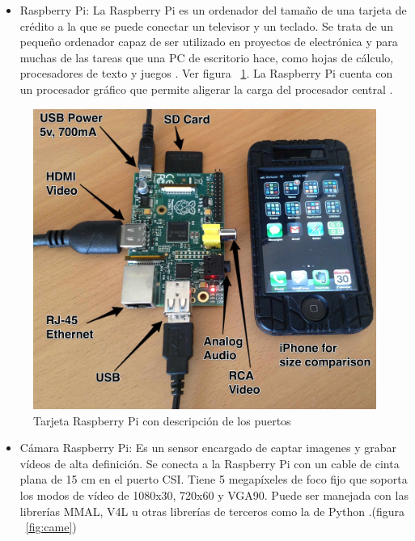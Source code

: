 \begin{itemize}
\item Raspberry Pi: La Raspberry Pi es un ordenador del tamaño de una tarjeta de crédito a la que se puede conectar un televisor y un teclado. Se trata de un pequeño ordenador capaz de ser utilizado en proyectos de electrónica y para muchas de las tareas que una PC de escritorio hace, como hojas de cálculo, procesadores de texto y juegos \cite{raspberry}. Ver figura ~\ref{fig:Raspe}. La Raspberry Pi cuenta con un procesador gráfico que permite aligerar la carga del procesador central \cite{elLinux}. 

\end{itemize}

\begin{figure}[hbtp]
\centering
\includegraphics[scale=0.1]{imagenes/raspberry_pi_iphone.jpg}
\caption{Tarjeta Raspberry Pi con descripción de los puertos}
\label{fig:Raspe}
\end{figure}

\begin{itemize}
\item C\'amara Raspberry Pi: Es un sensor encargado de captar imagenes y grabar vídeos de alta definición. Se conecta a la Raspberry Pi con un cable de cinta plana de 15 cm en el puerto CSI. Tiene 5 megapíxeles de foco fijo que soporta los modos de vídeo de 1080x30, 720x60 y VGA90. Puede ser manejada con las librerías MMAL, V4L u otras librerías de terceros como la de Python \cite{raspberrycam}.(figura ~\ref{fig:came})  %

\end{itemize}

